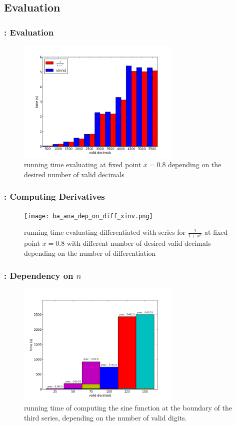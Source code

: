 \subsection{Evaluation}
\begin{frame}
\frametitle{: Evaluation}
			\begin{figure}[H]
				\centering
				\includegraphics[width=0.7\textwidth]{ba_ana_dep_on_n_bar.png}
				\caption{running time evaluating \baana at fixed point $x=0.8$ depending on the desired number of valid decimals}
				\label{fig:ba_ana dep on n}
			\end{figure}
\end{frame}
\begin{frame}
\frametitle{: Computing Derivatives}
			\begin{figure}[H]
				\centering
				\texttt{[image: ba\_ana\_dep\_on\_diff\_xinv.png]}
        \caption{running time evaluating differentiated \baana with series for 
          $\frac{1}{1+x^2}$ at fixed point $x=0.8$ with different number
        of desired valid decimals depending on the number of differentiation}
				\label{fig:ba_ana dep on differentiation}
			\end{figure}
\end{frame}
\begin{frame}
\frametitle{: Dependency on $n$}
		\begin{figure}[h]
			\centering
			\includegraphics[width=0.7\textwidth]{sin_for_series_4_dep_on_n.png}
			\caption{running time of \anarect computing the sine function at the boundary of the third series, depending on the number of valid digits. }
			\label{fig:sin dep on n}
		\end{figure}
\end{frame}
